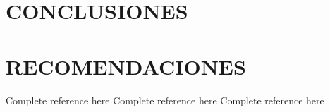 \section{CONCLUSIONES}

\section{RECOMENDACIONES}

\clearpage
\begin{thebibliography}{X}
     Complete reference here
     Complete reference here
     Complete reference here
\end{thebibliography}
